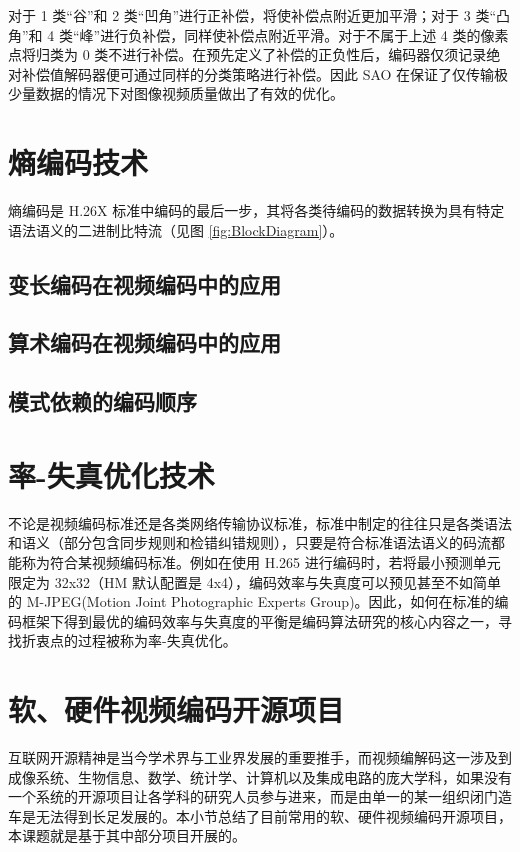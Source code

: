 对于 1 类“谷”和 2 类“凹角”进行正补偿，将使补偿点附近更加平滑；对于 3 类“凸角”和 4 类“峰”进行负补偿，同样使补偿点附近平滑。对于不属于上述 4 类的像素点将归类为 0 类不进行补偿。在预先定义了补偿的正负性后，编码器仅须记录绝对补偿值解码器便可通过同样的分类策略进行补偿。因此 SAO 在保证了仅传输极少量数据的情况下对图像视频质量做出了有效的优化。

\section{熵编码技术}
熵编码是 H.26X 标准中编码的最后一步，其将各类待编码的数据转换为具有特定语法语义的二进制比特流（见图 \ref{fig:BlockDiagram}）。
\subsection{变长编码在视频编码中的应用}
\subsection{算术编码在视频编码中的应用}
\subsection{模式依赖的编码顺序}

\section{率-失真优化技术}
不论是视频编码标准还是各类网络传输协议标准，标准中制定的往往只是各类语法和语义（部分包含同步规则和检错纠错规则），只要是符合标准语法语义的码流都能称为符合某视频编码标准。例如在使用 H.265 进行编码时，若将最小预测单元限定为 32x32（HM 默认配置是 4x4），编码效率与失真度可以预见甚至不如简单的 M-JPEG(Motion Joint Photographic Experts Group)。因此，如何在标准的编码框架下得到最优的编码效率与失真度的平衡是编码算法研究的核心内容之一，寻找折衷点的过程被称为率-失真优化。

\section{软、硬件视频编码开源项目}
互联网开源精神是当今学术界与工业界发展的重要推手，而视频编解码这一涉及到成像系统、生物信息、数学、统计学、计算机以及集成电路的庞大学科，如果没有一个系统的开源项目让各学科的研究人员参与进来，而是由单一的某一组织闭门造车是无法得到长足发展的。本小节总结了目前常用的软、硬件视频编码开源项目，本课题就是基于其中部分项目开展的。
